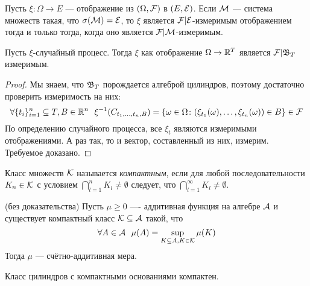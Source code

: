 \begin{reminder}
	Пусть $\xi \colon \Omega \to E$ --- отображение из $(\Omega, \mathcal{F})$ в $(E, \mathcal{E})$. Если $\mathcal{M}$ --- система множеств такая, что $\sigma(\mathcal{M}) = \mathcal{E}$, то $\xi$ является $\mathcal{F}|\mathcal{E}$-измеримым отображением тогда и только тогда, когда оно является $\mathcal{F}|\mathcal{M}$-измеримым.
\end{reminder}

\begin{proposition}
	Пусть $\xi$-случайный процесс. Тогда $\xi$ как отображение $\Omega \to \mathbb{R}^T$ является $\mathcal{F}|\mathfrak{B}_T$ измеримым.
\end{proposition}

\begin{proof}
	Мы знаем, что $\mathfrak{B}_T$ порождается алгеброй цилиндров, поэтому достаточно проверить измеримость на них:
	\[
		\forall \{t_i\}_{i = 1}^n \subseteq T, B \in \mathbb{R}^n\ \ \xi^{-1}(C_{t_1, \ldots, t_n, B}) = \{\omega \in \Omega \colon (\xi_{t_1}(\omega), \ldots, \xi_{t_n}(\omega)) \in B\} \in \mathcal{F}
	\]
	По определению случайного процесса, все $\xi_t$ являются измеримыми отображениями. А раз так, то и вектор, составленный из них, измерим. Требуемое доказано.
\end{proof}

\begin{definition}
	Класс множеств $\mathcal{K}$ называется \textit{компактным}, если для любой последовательности $K_n \in \mathcal{K}$ с условием $\bigcap_{l = 1}^n K_l \neq \emptyset$ следует, что  $\bigcap_{l = 1}^\infty K_l \neq \emptyset$.
\end{definition}

\begin{proposition} (без доказательства)
	Пусть $\mu \ge 0$ ---- аддитивная функция на алгебре $\mathcal{A}$ и существует компактный класс $\mathcal{K} \subseteq \mathcal{A}$ такой, что
	\[
		\forall A \in \cA\ \ \mu(A) = \sup_{K \subseteq A, K \in \cK} \mu(K)
	\]
	Тогда $\mu$ --- счётно-аддитивная мера.
\end{proposition}

\begin{exercise}
	Класс цилиндров с компактными основаниями компактен.
\end{exercise}
